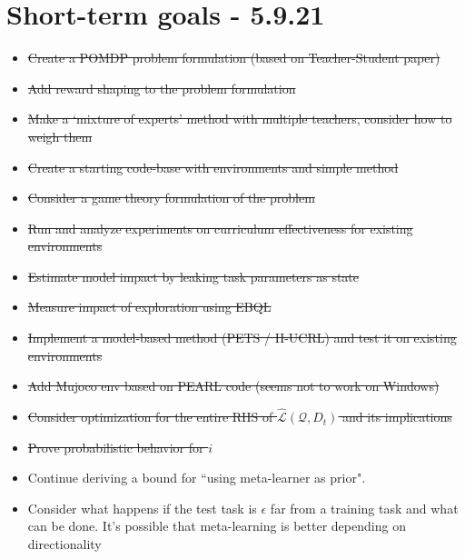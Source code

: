 \documentclass[letterpaper]{article}
\theoremstyle{definition}
\begin{document}
\section{Short-term goals - 5.9.21} \label{sec:short-term}

\begin{itemize}
	\item \sout{Create a POMDP problem formulation (based on Teacher-Student paper) }
	\item \sout{Add reward shaping to the problem formulation}
	\item \sout{Make a `mixture of experts' method with multiple teachers, consider how to weigh them}
	\item \sout{Create a starting code-base with environments and simple method}
	\item \sout{Consider a game theory formulation of the problem}
	\item \sout{Run and analyze experiments on curriculum effectiveness for existing environments}
	\item \sout{Estimate model impact by leaking task parameters as state}
	\item \sout{Measure impact of exploration using EBQL}
	\item \sout{Implement a model-based method (PETS / H-UCRL) and test it on existing environments}
	\item \sout{Add Mujoco env based on PEARL code (seems not to work on Windows)}
	\item \sout{Consider optimization for the entire RHS of $\hat{\mathcal{L}}(\mathcal{Q}, D_t)$ and its implications}
	\item \sout{Prove probabilistic behavior for $i$}
	\item Continue deriving a bound for ``using meta-learner as prior". 
	\item Consider what happens if the test task is $\epsilon$ far from a training task and what can be done. It's possible that meta-learning is better depending on directionality
\end{itemize}
\end{document}
